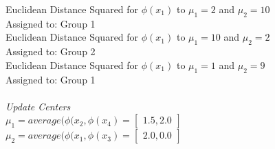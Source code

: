 \documentclass[12pt,letterpaper]{article}
\begin{document}
\begin{enumerate}
\begin{enumerate}
                    Euclidean Distance Squared for $\phi (x_{1})$ to $\mu_{1} = 2 $ and $\mu_{2} = 10$ \\
                    Assigned to: Group 1 \\
                    Euclidean Distance Squared for $\phi (x_{1})$ to $\mu_{1} = 10 $ and $\mu_{2} = 2$ \\
                    Assigned to: Group 2 \\
                    Euclidean Distance Squared for $\phi (x_{1})$ to $\mu_{1} = 1 $ and $\mu_{2} = 9$ \\
                    Assigned to: Group 1 \\ \\
                    \textit{Update Centers} \\
                    $\mu_{1} = average(\phi (x_{2}, \phi (x_{4}) =  \begin{bmatrix} 1.5, 2.0 \end{bmatrix} $ \\
                    $\mu_{2} = average(\phi (x_{1}, \phi (x_{3}) =  \begin{bmatrix} 2.0, 0.0 \end{bmatrix}$ \\ \\
                    

\end{enumerate}
\end{enumerate}
\end{document}
